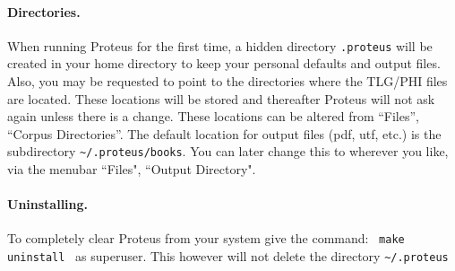 \documentclass[11pt,a4paper]{article}
\begin{document}
    \paragraph{Directories.}When running Proteus for the first time, a hidden directory {\tt .proteus}
      will be created in your home directory to keep your personal defaults and output files.
      Also, you may be requested to point to the directories where the TLG/PHI
      files are located. These locations will be stored and thereafter
      Proteus will not ask again unless there is a change.
      These locations can be altered from ``Files'', ``Corpus Directories''.
      The default location for output files (pdf, utf, etc.) is the
      subdirectory {\tt \~{}/.proteus/books}.  You can later change this
      to wherever you like, via the menubar ``Files", ``Output Directory".
    \paragraph{Uninstalling.}
      To completely clear Proteus from your system give the command:~
      {\tt make uninstall}~ as superuser.  This however will not
      delete the directory {\tt \~{}/.proteus}
  \newpage
\end{document}
